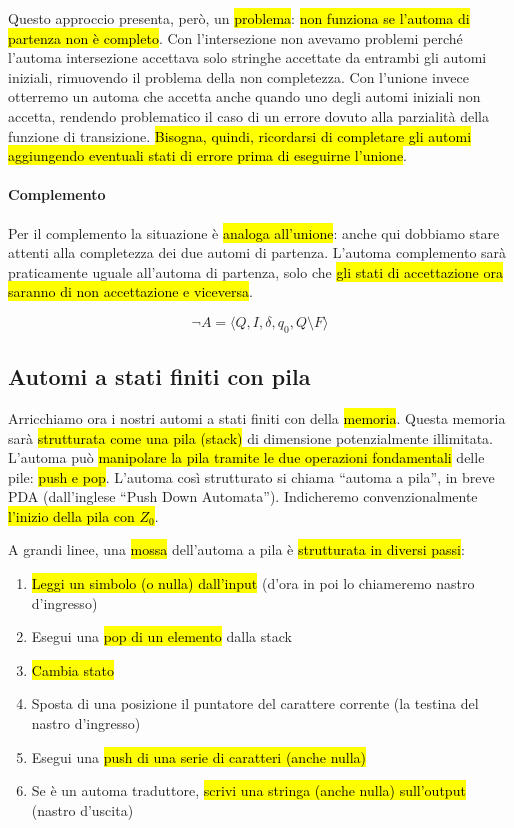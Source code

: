 \documentclass[a4paper,11pt,oneside]{article}
\theoremstyle{plain}
\theoremstyle{definition}
\theoremstyle{remark}
\begin{document}
Questo approccio presenta, però, un \hl{problema}: \hl{non funziona se l'automa
di partenza non è completo}. Con l'intersezione non avevamo problemi perché
l'automa intersezione accettava solo stringhe accettate da entrambi gli automi
iniziali, rimuovendo il problema della non completezza. Con l'unione invece
otterremo un automa che accetta anche quando uno degli automi iniziali non
accetta, rendendo problematico il caso di un errore dovuto alla parzialità della
funzione di transizione. \hl{Bisogna, quindi, ricordarsi di completare gli
automi aggiungendo eventuali stati di errore prima di eseguirne l'unione}.

\paragraph{Complemento} Per il complemento la situazione è \hl{analoga all'unione}:
anche qui dobbiamo stare attenti alla completezza dei due automi di partenza.
L'automa complemento sarà praticamente uguale all'automa di partenza, solo che
\hl{gli stati di accettazione ora saranno di non accettazione e viceversa}.

\begin{equation}
  \neg A = \langle Q, I, \delta, q_0, Q \setminus F \rangle
\end{equation}

\subsection{Automi a stati finiti con pila}\label{sec:pda}

Arricchiamo ora i nostri automi a stati finiti con della \hl{memoria}. Questa
memoria sarà \hl{strutturata come una pila (stack)} di dimensione potenzialmente
illimitata. L'automa può \hl{manipolare la pila tramite le due operazioni
fondamentali} delle pile: \hl{push e pop}. L'automa così strutturato si chiama
``automa a pila'', in breve PDA (dall'inglese ``Push Down Automata'').
Indicheremo convenzionalmente \hl{l'inizio della pila con $Z_0$}.

A grandi linee, una \hl{mossa} dell'automa a pila è \hl{strutturata in diversi
passi}:

\begin{enumerate}
  \item \hl{Leggi un simbolo (o nulla) dall'input} (d'ora in poi lo chiameremo
    nastro d'ingresso)
  \item Esegui una \hl{pop di un elemento} dalla stack
  \item \hl{Cambia stato}
  \item Sposta di una posizione il puntatore del carattere corrente (la testina
    del nastro d'ingresso)
  \item Esegui una \hl{push di una serie di caratteri (anche nulla)}
  \item Se è un automa traduttore, \hl{scrivi una stringa (anche nulla)
    sull'output} (nastro d'uscita)
\end{enumerate}
\end{document}
